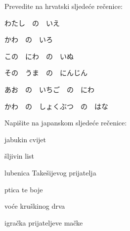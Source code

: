 
\author{Tomislav Mamić, Željka Ludošan}



	\begin{mondai}{Prevedite na hrvatski sljedeće rečenice:}
		\item わたし　の　いえ
		\item かわ　の　いろ

		\item この　にわ　の　いぬ
		\item その　うま　の　にんじん

		\item あお　の　いちご　の　にわ
		\item かわ　の　しょくぶつ　の　はな
	\end{mondai}

	\begin{mondai}{Napišite na japanskom sljedeće rečenice:}
		\item jabukin cvijet
		\item šljivin list

		\item lubenica Takešijevog prijatelja
		\item ptica te boje

		\item voće kruškinog drva
		\item igračka prijateljeve mačke
	\end{mondai}

